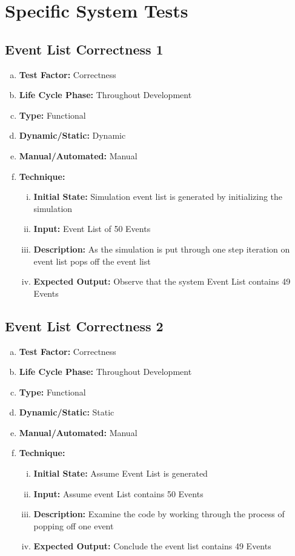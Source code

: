 \documentclass[paper=letter, fontsize=10pt]{scrartcl}
\numberwithin{equation}{section}		%
\numberwithin{figure}{section}			%
\numberwithin{table}{section}				%
\begin{document}
\section{Specific System Tests}
\subsection{Event List Correctness 1}
\begin{enumerate}[(a)]
	\item \textbf{Test Factor:} Correctness
	\item \textbf{Life Cycle Phase:} Throughout Development
	\item \textbf{Type:} Functional
	\item \textbf{Dynamic/Static:} Dynamic
	\item \textbf{Manual/Automated:} Manual
	\item \textbf{Technique:} 
		\begin{enumerate}[(i)]
			\item \textbf{Initial State:} Simulation event list is generated by initializing the simulation			
			\item \textbf{Input:} Event List of 50 Events
			\item \textbf{Description:} As the simulation is put through one step iteration on event list pops off the event list
			\item \textbf{Expected Output:} Observe that the system Event List contains 49 Events
		\end{enumerate}
\end{enumerate}

\subsection{Event List Correctness 2}
\begin{enumerate}[(a)]
	\item \textbf{Test Factor:} Correctness
	\item \textbf{Life Cycle Phase:} Throughout Development
	\item \textbf{Type:} Functional
	\item \textbf{Dynamic/Static:} Static
	\item \textbf{Manual/Automated:} Manual
	\item \textbf{Technique:} 
		\begin{enumerate}[(i)]
			\item \textbf{Initial State:} Assume Event List is generated			
			\item \textbf{Input:} Assume event List contains 50 Events
			\item \textbf{Description:} Examine the code by working through the process of popping off one event
			\item \textbf{Expected Output:} Conclude the event list contains 49 Events
		\end{enumerate}
\end{enumerate}
\end{document}
